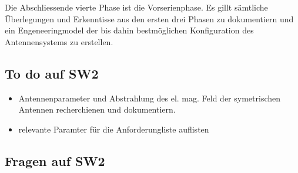 Die Abschliessende vierte Phase ist die Vorserienphase. Es gillt sämtliche Überlegungen und Erkenntisse aus den ersten drei Phasen zu dokumentiern und ein Engeneeringmodel der bis dahin  bestmöglichen Konfiguration des Antennensystems zu erstellen. 
\subsection{To do auf SW2}
\begin{itemize}
	\item Antennenparameter und Abstrahlung des el. mag. Feld der symetrischen Antennen recherchienen und dokumentiern.
	\item relevante Paramter für die Anforderungliste auflisten
\end{itemize}
\subsection{Fragen auf SW2}
%